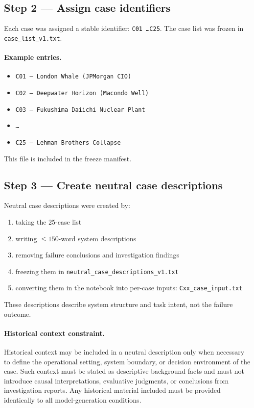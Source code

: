 \subsection*{Step 2 --- Assign case identifiers}
Each case was assigned a stable identifier: \texttt{C01 \dots C25}. The case list was frozen in
\texttt{case\_list\_v1.txt}.

\paragraph{Example entries.}
\begin{itemize}
  \item \texttt{C01 --- London Whale (JPMorgan CIO)}
  \item \texttt{C02 --- Deepwater Horizon (Macondo Well)}
  \item \texttt{C03 --- Fukushima Daiichi Nuclear Plant}
  \item \texttt{\dots}
  \item \texttt{C25 --- Lehman Brothers Collapse}
\end{itemize}
This file is included in the freeze manifest.

\subsection*{Step 3 --- Create neutral case descriptions}
Neutral case descriptions were created by:
\begin{enumerate}
  \item taking the 25-case list
  \item writing $\leq 150$-word system descriptions
  \item removing failure conclusions and investigation findings
  \item freezing them in \texttt{neutral\_case\_descriptions\_v1.txt}
  \item converting them in the notebook into per-case inputs:
        \texttt{Cxx\_case\_input.txt}
\end{enumerate}
These descriptions describe system structure and task intent, not the failure outcome.

\paragraph{Historical context constraint.}
Historical context may be included in a neutral description only when necessary to define the operational setting,
system boundary, or decision environment of the case. Such context must be stated as descriptive background facts and
must not introduce causal interpretations, evaluative judgments, or conclusions from investigation reports. Any historical
material included must be provided identically to all model-generation conditions.

